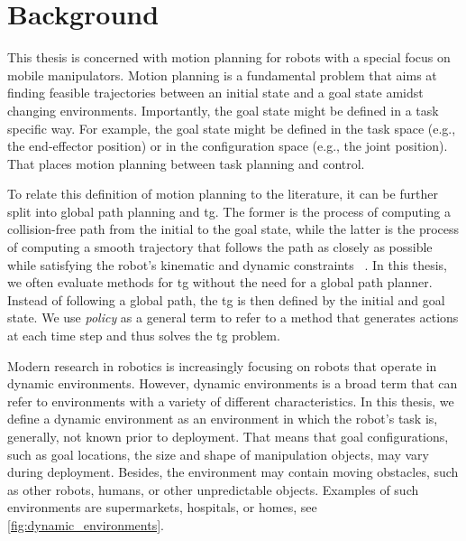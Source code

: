 ﻿\chapter{Background} %
\label{cha:background}

\blfootnote{
  \partscontentfootnote
  \begin{itemize}
    \item \trodynamic
    \item \icraautotuning
    \item \icracoupled
  \end{itemize}
}



\newpage

This thesis is concerned with motion planning for robots
with a special focus on mobile manipulators.
Motion planning is a fundamental problem that
aims at finding feasible trajectories between an initial
state and a goal state amidst changing
environments. Importantly, the goal state might be defined in a
task specific way. For example, the goal state might be
defined in the task space (e.g., the end-effector position)
or in the configuration space (e.g., the joint position).
That places motion planning between task planning and control.

To relate this definition of motion planning to the literature,
it can be further split into global path planning and
\ac{tg}. The former is the process of
computing a collision-free path from the initial to the
goal state, while the latter is the process of computing a
smooth trajectory that follows the path as closely as
possible while satisfying the robot's kinematic and dynamic
constraints ~\cite{Rickert2014}. In this thesis, we often
evaluate methods for \ac{tg} without the need for a global
path planner. Instead of following a global path, the
\ac{tg} is then defined by the initial and goal state.
We use \textit{policy} as a general term to refer to 
a method that generates actions at each time step and thus
solves the \ac{tg} problem.

Modern research in robotics is increasingly focusing on
robots that operate in dynamic environments. However,
dynamic environments is a broad term that can refer to
environments with a variety of different characteristics. In
this thesis, we define a dynamic environment as an
environment in which the robot's task is, generally, not
known prior to deployment. That means that goal configurations, such as
goal locations, the size and shape of manipulation objects,
may vary during deployment. Besides, the environment may
contain moving obstacles, such as other robots, humans, or
other unpredictable objects. Examples of such environments
are supermarkets, hospitals, or homes, see \cref{fig:dynamic_environments}.

